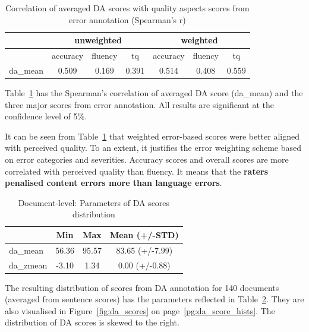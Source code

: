 \begin{table}[H]
	\centering
	\begin{tabular}{l|ccc|ccc}
		\toprule
				& \multicolumn{3}{c|}{unweighted} & \multicolumn{3}{c}{weighted} \\
		\midrule
		& accuracy   & fluency & tq    & accuracy & fluency & tq    \\
		\midrule
		da\_mean & 0.509      & 0.169   & 0.391 & 0.514    & 0.408   & 0.559 \\
		\bottomrule
	\end{tabular}
\caption{\label{tab:doc_err-da_corr}Correlation of averaged DA scores with quality aspects scores from error annotation (Spearman's r)}
\end{table}

Table~\ref{tab:doc_err-da_corr} has the Spearman's correlation of averaged DA score (da\_mean) and the three major scores from error annotation. All results are significant at the confidence level of 5\%.

It can be seen from Table~\ref{tab:doc_err-da_corr} that weighted error-based scores were better aligned with perceived quality. To an extent, it justifies the error weighting scheme based on error categories and severities. Accuracy scores and overall scores are more correlated with perceived quality than fluency. It means that the \textbf{raters penalised content errors more than language errors}. 

\begin{table}[H]
	\centering
	\begin{tabular}{l|ccc}
		\toprule
		& Min   & Max    & Mean (+/-STD)          \\
		\midrule
		da\_mean  & 56.36 & 95.57 & 83.65 (+/-7.99) \\
		da\_zmean & -3.10 & 1.34  & 0.00 (+/-0.88) \\
		\bottomrule
	\end{tabular}
	\caption{\label{tab:doc_da_dist}Document-level: Parameters of DA scores distribution}
\end{table}

The resulting distribution of scores from DA annotation for 140 documents (averaged from sentence scores) has the parameters reflected in Table~\ref{tab:doc_da_dist}. They are also visualised in Figure~\ref{fig:da_scores} on page~\ref{pg:da_score_hists}. The distribution of DA scores is skewed to the right. 


